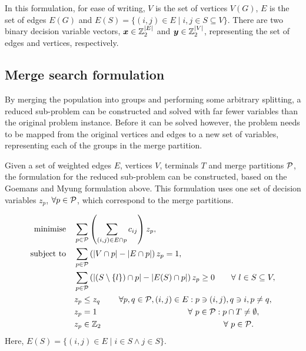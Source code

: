\documentclass[preprint]{elsarticle}
\begin{document}
In this formulation, for ease of writing, \(V\) is the set of vertices \(V(G)\), \(E\) is the set of edges \(E(G)\) and \(E(S) = \{(i,j) \in E \mid i,j \in S \subseteq V\}\). There are two binary decision variable vectors, \(\V{x} \in \Bin^{|E|}\) and \(\V{y} \in \Bin^{|V|}\), representing the set of edges and vertices, respectively.

\subsection*{Merge search formulation}
By merging the population into groups and performing some arbitrary splitting, a reduced sub-problem can be constructed and solved with far fewer variables than the original problem instance. Before it can be solved however, the problem needs to be mapped from the original vertices and edges to a new set of variables, representing each of the groups in the merge partition.

Given a set of weighted edges \(E\), vertices \(V\), terminals \(T\) and merge partitions \(\S{P}\), the formulation for the reduced sub-problem can be constructed, based on the Goemans and Myung formulation above. This formulation uses one set of decision variables \(z_p\), \(\forall p \in \S{P}\), which correspond to the merge partitions.


{\footnotesize
\begin{align}
\Min \quad & \displaystyle\sum_{p \in \S{P}}\left(\displaystyle\sum_{(i,j) \in E \cap p} c_{ij}\right)z_{p},\label{eq:stpg_merge}\\
\ST \quad & \displaystyle\sum_{p \in \S{P}}\left(|V\cap p| - |E\cap p|\right)z_{p} = 1,\nonumber\\
& \displaystyle\sum_{p \in \S{P}}\left(|(S\setminus\{l\}) \cap p| - |E(S)\cap p|\right)z_{p} \geq 0 \qquad \forall\ l \in S \subseteq V,\nonumber\\
& z_p \leq z_q \hspace{0.8cm} \forall  p,q\in \S{P},(i,j) \in E : p \ni (i,j),q \ni i,p \neq q, \nonumber\\
& z_p = 1 \hspace{3.9cm}  \forall\ p \in \S{P} :  p \cap T \neq \emptyset,\nonumber\\
& z_p \in \Bin \hspace{5.25cm} \forall\ p \in \S{P}\nonumber.
\end{align}
}
%
Here, \(E(S) = \{(i,j) \in E \mid i \in S \land j \in S\}.\)
\end{document}
